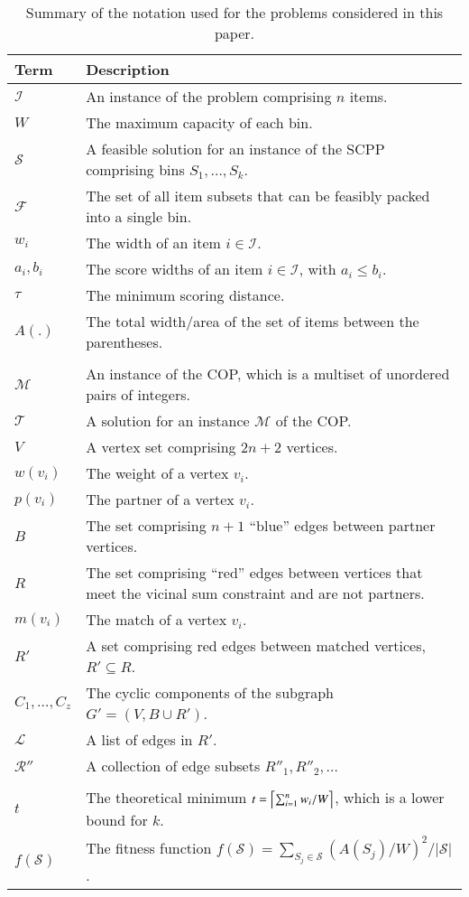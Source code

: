 \documentclass[a4paper,11pt,authoryear]{elsarticle}
\begin{document}
\begin{table}[h]
\centering
\caption{Summary of the notation used for the problems considered in this paper.}
\footnotesize
\begin{tabular}{l p{12cm}}
	\toprule
	Term & Description \\
	\midrule
	$\mathcal{I}$ & An instance of the problem comprising $n$ items. \\
	$W$ & The maximum capacity of each bin.\\
	$\mathcal{S}$ & A feasible solution for an instance of the SCPP comprising bins $S_1,\dotsc,S_k$.\\
	$\mathcal{F}$ & The set of all item subsets that can be feasibly packed into a single bin.\\
	$w_i$ & The width of an item $i \in \mathcal{I}$.\\
	$a_i, b_i$ & The score widths of an item $i \in \mathcal{I}$, with $a_i \leq b_i$.\\
	$\tau$ & The minimum scoring distance.\\
	$A(.)$ & The total width/area of the set of items between the parentheses.\\
	& \\
	$\mathcal{M}$ & An instance of the COP, which is a multiset of unordered pairs of integers.\\
	$\mathcal{T}$ & A solution for an instance $\mathcal{M}$ of the COP.\\
	$V$ & A vertex set comprising $2n+2$ vertices.\\
	$w(v_i)$ & The weight of a vertex $v_i$.\\
	$p(v_i)$ & The partner of a vertex $v_i$.\\
	$B$ & The set comprising $n+1$ ``blue'' edges between partner vertices.\\
	$R$ & The set comprising ``red'' edges between vertices that meet the vicinal sum constraint and are not partners.\\
	$m(v_i)$ & The match of a vertex $v_i$.\\
	$R'$ & A set comprising red edges between matched vertices, $R' \subseteq R$.\\
	$C_1,\dotsc,C_z$ & The cyclic components of the subgraph $G' =(V, B \cup R')$.\\
	$\mathcal{L}$ & A list of edges in $R'$.\\
	$\mathcal{R}''$ & A collection of edge subsets $R''_1, R''_2,\dots$\\
	& \\
	$t$ & The theoretical minimum $t = \ceil*{\sum_{i=1}^{n} w_i / W}$, which is a lower bound for $k$.\\
	$f(\mathcal{S})$ & The fitness function $f(\mathcal{S}) = \sum_{S_j \in \mathcal{S}} (A(S_j)/W)^2 / |\mathcal{S}|$.\\
	\bottomrule
\end{tabular}	
\label{table:notation}
\end{table}
\end{document}
